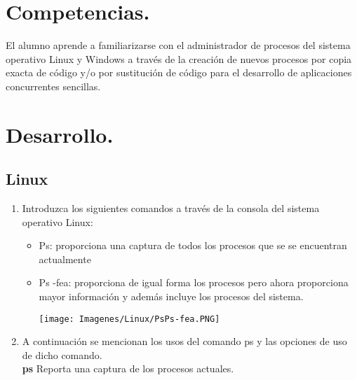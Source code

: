 \documentclass[12pt]{article}
\begin{document}
\section{Competencias.}
El alumno aprende a familiarizarse con el administrador de procesos del sistema operativo Linux y Windows a través de la creación de nuevos procesos por copia exacta de código y/o por sustitución de código para el desarrollo de aplicaciones concurrentes sencillas.
\section{Desarrollo.}
    \subsection{Linux}
    \begin{enumerate}
        \item Introduzca los siguientes comandos a través de la consola del sistema operativo Linux:
        \begin{itemize}
            \item Ps: proporciona una captura de todos los procesos que se se encuentran actualmente
            \item Ps -fea: proporciona de igual forma los procesos pero ahora proporciona mayor información y además incluye los procesos del sistema.
             \begin{center}
                \texttt{[image: Imagenes/Linux/PsPs-fea.PNG]}
            \end{center}

        \end{itemize}
        \item A continuación se mencionan los  usos del comando  ps y  las opciones de uso de dicho comando.\\
       \textbf{ps}  Reporta una captura de los procesos actuales.
       

\end{enumerate}
\end{document}
